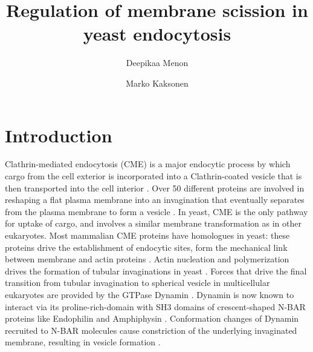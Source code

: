 \documentclass[9pt,lineno]{elife}
\title{Regulation of membrane scission in yeast endocytosis}
\author[1]{Deepikaa Menon}
\author[1*]{Marko Kaksonen}
\affil[1]{Department of Biochemistry, University of Geneva, Geneva, Switzerland}
\begin{document}
\maketitle

\begin{abstract}

\end{abstract}


\section{Introduction}

Clathrin-mediated endocytosis (CME) is a major endocytic process by which cargo from the cell exterior is incorporated into a Clathrin-coated vesicle that is then transported into the cell interior \citep{Bitsikas2014}. Over 50 different proteins are involved in reshaping a flat plasma membrane into an invagination that eventually separates from the plasma membrane to form a vesicle \citep{Kaksonen2018}. In yeast, CME is the only pathway for uptake of cargo, and involves a similar membrane transformation as in other eukaryotes. Most mammalian CME proteins have homologues in yeast: these proteins drive the establishment of endocytic sites, form the mechanical link between membrane and actin proteins \citep{Kaksonen2018}. Actin nucleation and polymerization drives the formation of tubular invaginations in yeast \citep{Kubler1993a, Kaksonen2003}. Forces that drive the final transition from tubular invagination to spherical vesicle in multicellular eukaryotes are provided by the GTPase Dynamin \citep{Grigliatti1973, Sweitzer1998, Ferguson2007,Takei1995, Galli2017}. Dynamin is now known to interact via its proline-rich-domain with SH3 domains of crescent-shaped N-BAR proteins like Endophilin and Amphiphysin  \citep{Grabs1997,Cestra1999,Farsad2001,Ferguson2009,Meinecke2013b}. Conformation changes of Dynamin recruited to N-BAR molecules cause constriction of the underlying invaginated membrane, resulting in vesicle formation  \citep{Shupliakov1997,Zhang2001,Zhao2016}.

~\\
\end{document}
